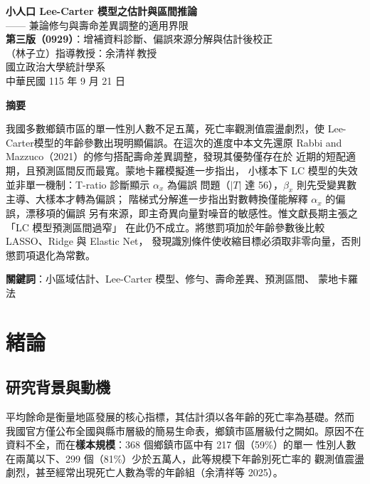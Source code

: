 \documentclass[UTF8, fontset=macnew, a4paper, 12pt]{ctexart}
\begin{document}
\begin{center}
{\bfseries 小人口 Lee-Carter 模型之估計與區間推論}\\[4pt]
{ —— 兼論修勻與壽命差異調整的適用界限}\\[4pt]
{\textbf{第三版（0929）}：增補資料診斷、偏誤來源分解與估計後校正}\\[12pt]
{ （林子立）\quad 指導教授：余清祥\,教授}\\[4pt]
{ 國立政治大學統計學系}\\[4pt]
{ 中華民國 115 年 9 月 21 日}
\end{center}

\vspace{6pt}
\begin{center}
\begin{minipage}{0.92\textwidth}
\small
\textbf{摘要}\par\vspace{4pt}
我國多數鄉鎮市區的單一性別人數不足五萬，死亡率觀測值震盪劇烈，使
Lee-Carter模型的年齡參數出現明顯偏誤。在這次的進度中本文先還原
Rabbi and Mazzuco（2021）的修勻搭配壽命差異調整，發現其優勢僅存在於
近期的短配適期，且預測區間反而最寬。蒙地卡羅模擬進一步指出，
小樣本下 LC 模型的失效並非單一機制：T-ratio 診斷顯示 $\alpha_x$ 為偏誤
問題（$|T|$ 達 56），$\beta_x$ 則先受變異數主導、大樣本才轉為偏誤；
階梯式分解進一步指出對數轉換僅能解釋 $\alpha_x$ 的偏誤，漂移項的偏誤
另有來源，即主奇異向量對噪音的敏感性。惟文獻長期主張之「LC 模型預測區間過窄」
在此仍不成立。將懲罰項加於年齡參數後比較 LASSO、Ridge 與 Elastic Net，
發現識別條件使收縮目標必須取非零向量，否則懲罰項退化為常數。
\par\vspace{6pt}
\textbf{關鍵詞}：小區域估計、Lee-Carter 模型、修勻、壽命差異、預測區間、
蒙地卡羅法
\end{minipage}
\end{center}

\vspace{10pt}

\section{緒論}

\subsection{研究背景與動機}

平均餘命是衡量地區發展的核心指標，其估計須以各年齡的死亡率為基礎。然而
我國官方僅公布全國與縣市層級的簡易生命表，鄉鎮市區層級付之闕如。原因不在
資料不全，而在\textbf{樣本規模}：368 個鄉鎮市區中有 217 個（59\%）的單一
性別人數在兩萬以下、299 個（81\%）少於五萬人，此等規模下年齡別死亡率的
觀測值震盪劇烈，甚至經常出現死亡人數為零的年齡組（余清祥等 2025）。
\end{document}

